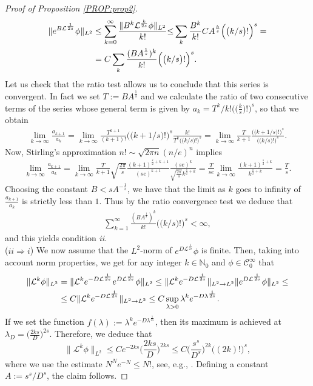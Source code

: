 \documentclass[12pt,oneside,a4paper]{book}
\numberwithin{equation}{section}     %
\theoremstyle{plain}
\theoremstyle{definition}
\newcommand{\N}{{\mathbb N}}
\newcommand{\slp}{{\mathcal L}}
\begin{document}
\begin{proof}[Proof of Proposition \ref{PROP:prop2}]
	\begin{align}\notag
	\|e^{B\slp^{\frac{1}{2s}}}\phi\|_{L^2}&\leq\sum_{k=0}^\infty \frac{\|B^k\slp^{\frac{k}{2s}}\phi\|_{L^2}}{k!}{\leq}\sum_k\frac{B^k}{k!}CA^{\frac{k}{s}}\Big(\big(k/s\big)!\Big)^s=\\&=C\sum_k\frac{(BA^{\frac{1}{s}})^k}{k!}\Big(\big(k/s\big)!\Big)^s.\notag
	\end{align}
	Let us check that the ratio test allows us to conclude that this series is convergent. In fact we set $T:=BA^{\frac{1}{s}}$ and we calculate the ratio of two consecutive terms of the series whose general term is given by $a_k=T^k/k!\Big(\big(\frac{k}{s}\big)!\Big)^s$, so that we obtain 
	\begin{align*}
	\lim_{k\rightarrow\infty}\frac{a_{k+1}}{a_k}=\lim_{k\rightarrow\infty}\frac{T^{k+1}}{(k+1)!}\Big(\big(k+1/s\big)!\Big)^s\frac{k!}{T^k\big(\big(k/s\big)!\big)^s}=\lim_{k\rightarrow\infty}\frac{T}{k+1}\frac{\big(\big(k+1/s\big)!\big)^s}{\big(\big(k/s\big)!\big)^s}.
	\end{align*} 
	Now, Stirling's approximation $ n ! \sim \sqrt{2\pi n} (n/e)^n $ implies 
	\begin{align*}
	\lim_{k\rightarrow\infty}\frac{a_{k+1}}{a_k}=\lim_{k\rightarrow\infty}\frac{T}{k+1}\sqrt{\frac{2\pi}{s}}\frac{(k+1)^{\frac{s}{2}+k+1}}{(se)^{k+1}}\frac{(se)^k}{\sqrt{\frac{2\pi}{s}}k^{\frac{s}{2}+k}}=\frac{T}{se}\lim_{k\rightarrow\infty}\frac{(k+1)^{\frac{s}{2}+k}}{k^{\frac{s}{2}+k}}=\frac{T}{s}.
	\end{align*} 
	Choosing the constant $B<sA^{-\frac{1}{s}}$, we have that the limit as $k$ goes to infinity of $\frac{a_{k+1}}{a_k}$ is strictly less than $1$. Thus by the ratio convergence test we deduce that
	\begin{align*}
	\sum_{k=1}^\infty\frac{(BA^{\frac{1}{s}})^k}{k!}\Big(\big(k/s\big)!\Big)^s<\infty,
	\end{align*}
	and this yields condition \textit{ii.}\\
	
	($ii \Rightarrow i$) 
	We now assume that the $L^2$-norm of $e^{D\slp^{\frac{1}{2s}}}\phi$ is finite. Then, taking into account norm properties, we get for any integer $k\in\N_0$ and $\phi\in\mathcal C^\infty_0$ that
	\begin{align}\notag
	\|\slp^k \phi\|_{L^2}&=\|\slp^k e^{-D\slp^{\frac{1}{2s}}}e^{D\slp^{\frac{1}{2s}}}\phi\|_{L^2}\leq\|\slp^k e^{-D\slp^{\frac{1}{2s}}}\|_{L^2\rightarrow L^2}\|e^{D\slp^{\frac{1}{2s}}}\phi\|_{L^2}\leq\\\notag
	&\leq C\|\slp^k e^{-D\slp^{\frac{1}{2s}}}\|_{L^2\rightarrow L^2}\leq C \sup_{\lambda>0} \lambda^k e^{-D\lambda^{\frac{1}{2s}}}.
	\end{align}
	If we set the function $f(\lambda):=\lambda^k e^{-D\lambda^{\frac{1}{2s}}}$, then its maximum is achieved at $\lambda_D=\big (\frac{2ks}{D}\big)^{2s}$. Therefore, we deduce that
	\[
	\|\slp^k \phi\|_{L^2}\leq C e^{-2ks}\Big( \frac{2ks}{D}\Big)^{2ks}\leq C\Big(\frac{s^s}{D^s}\Big)^{2k}\big((2k)!\big)^s,
	\]
	where we use the estimate $N^N e^{-N}\leq N!$, see, e.g., \cite{R1993}. Defining a constant $A:=s^s/D^s$, the claim follows.
\end{proof}
\end{document}

